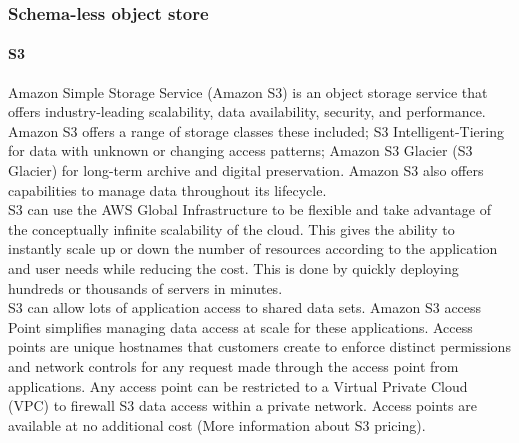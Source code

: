 \documentclass[10pt]{article}
\begin{document}
\subsubsection{Schema-less object store}
\paragraph{S3}
Amazon Simple Storage Service (Amazon S3) \cite{S3} is an object storage service that offers industry-leading scalability, data availability, security, and performance. Amazon S3 offers a range of storage classes these included; S3 Intelligent-Tiering for data with unknown or changing access patterns; Amazon S3 Glacier (S3 Glacier) for long-term archive and digital preservation. Amazon S3 also offers capabilities to manage data throughout its lifecycle. \\
S3 can use the AWS Global Infrastructure to be flexible and take advantage of the conceptually infinite scalability of the cloud. This gives the ability to instantly scale up or down the number of resources according to the application and user needs while reducing the cost. This is done by quickly deploying hundreds or thousands of servers in minutes.\\
S3 can allow lots of application access to shared data sets. Amazon S3 access Point simplifies managing data access at scale for these applications. Access points are unique hostnames that customers create to enforce distinct permissions and network controls for any request made through the access point from applications. Any access point can be restricted to a Virtual Private Cloud (VPC) to firewall S3 data access within a private network. Access points are available at no additional cost (More information about S3 pricing\cite{S3-pricing}).\\
\end{document}
